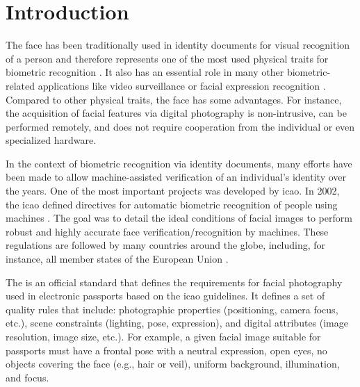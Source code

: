 \section{Introduction}

The face has been traditionally used in identity documents for visual recognition of a person and therefore represents one of the most used physical traits for biometric recognition \citep{ferrara2012face}. It also has an essential role in many other biometric-related applications like video surveillance \citep{de2015partially} or facial expression recognition \citep{anil2016literature}. Compared to other physical traits, the face has some advantages. For instance, the acquisition of facial features via digital photography is non-intrusive, can be performed remotely, and does not require cooperation from the individual or even specialized hardware.


In the context of biometric recognition via identity documents, many efforts have been made to allow machine-assisted verification of an individual's identity over the years. One of the most important projects was developed by \acf{icao}. In 2002, the \acs{icao} defined directives for automatic biometric recognition of people using machines \citep{icao2003report}. The goal was to detail the ideal conditions of facial images to perform robust and highly accurate face verification/recognition by machines. These regulations are followed by many countries around the globe, including, for instance, all member states of the European Union \citep{ebinger2008international}.

The \icao \citep{iso-iec} is an official standard that defines the requirements for facial photography used in electronic passports based on the \acs{icao} guidelines. It defines a set of quality rules that include: photographic properties (positioning, camera focus, etc.), scene constraints (lighting, pose, expression), and digital attributes (image resolution, image size, etc.). For example, a given facial image suitable for passports must have a frontal pose with a neutral expression, open eyes, no objects covering the face (e.g., hair or veil), uniform background, illumination, and focus.


